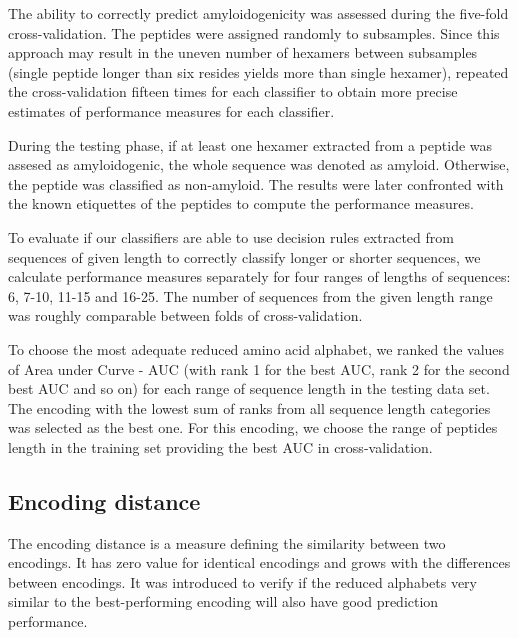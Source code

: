 \documentclass{bioinfo}
\begin{document}
\begin{methods}
The ability to correctly predict amyloidogenicity was assessed during the 
five-fold cross-validation. The peptides were assigned randomly to 
subsamples. Since this approach may result in the uneven number of hexamers 
between subsamples (single peptide longer than six resides yields more than 
single hexamer), repeated the cross-validation fifteen times for each classifier 
to obtain more precise estimates of performance measures for each classifier. 

  During the testing phase, if at least one hexamer extracted from a peptide was 
assesed as amyloidogenic, the whole sequence was denoted as amyloid. Otherwise,
the peptide was classified as non-amyloid. The results were later confronted with 
the known etiquettes of the peptides to compute the performance measures.

  To evaluate if our classifiers are able to use decision rules extracted from 
sequences of given length to correctly classify longer or shorter sequences, we 
calculate performance measures separately for four ranges of lengths of 
sequences: 6, 7-10, 11-15 and 16-25. The number of sequences from the given 
%
%
%
length range was roughly comparable between folds of cross-validation.
  
  To choose the most adequate reduced amino acid alphabet, we ranked the values 
%
%
%
of Area under Curve - AUC (with rank 1 for the best AUC, rank 2 for the second 
best AUC and so on) for each range of sequence length in the testing data set. 
The encoding with the lowest sum of ranks from all sequence length categories 
was selected as the best one. For this encoding, we choose the range of peptides 
length in the training set providing the best AUC in cross-validation.

\subsection{Encoding distance}
The encoding distance is a measure defining the similarity between two 
encodings. It has zero value for identical encodings and grows with the 
differences between encodings. It was introduced to verify if the reduced 
alphabets very similar to the best-performing encoding will also have good 
prediction performance.


\end{methods}
\end{document}
